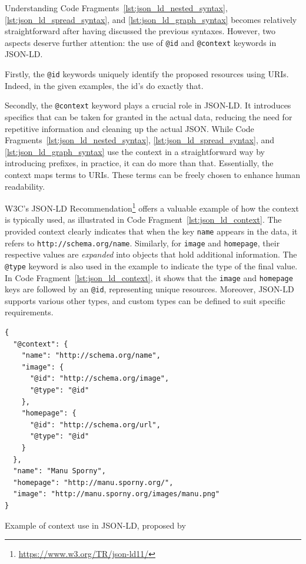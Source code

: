 \begin{itemize}
    Understanding Code Fragments~\ref{lst:json_ld_nested_syntax}, \ref{lst:json_ld_spread_syntax}, and \ref{lst:json_ld_graph_syntax} becomes relatively straightforward after having discussed the previous syntaxes. However, two aspects deserve further attention: the use of \texttt{@id} and \texttt{@context} keywords in JSON-LD.

    Firstly, the \texttt{@id} keywords uniquely identify the proposed resources using URIs. Indeed, in the given examples, the id's do exactly that. \citep{kellogg2020jsonld}

    Secondly, the \texttt{@context} keyword plays a crucial role in JSON-LD. It introduces specifics that can be taken for granted in the actual data, reducing the need for repetitive information and cleaning up the actual JSON. While Code Fragments~\ref{lst:json_ld_nested_syntax}, \ref{lst:json_ld_spread_syntax}, and \ref{lst:json_ld_graph_syntax} use the context in a straightforward way by introducing prefixes, in practice, it can do more than that. Essentially, the context maps terms to URIs. These terms can be freely chosen to enhance human readability. \citep{kellogg2020jsonld}

    W3C's JSON-LD Recommendation\footnote{\href{https://www.w3.org/TR/json-ld11/}{https://www.w3.org/TR/json-ld11/}} offers a valuable example of how the context is typically used, as illustrated in Code Fragment~\ref{lst:json_ld_context}. The provided context clearly indicates that when the key \texttt{name} appears in the data, it refers to \texttt{http://schema.org/name}. Similarly, for \texttt{image} and \texttt{homepage}, their respective values are \textit{expanded} into objects that hold additional information. The \texttt{@type} keyword is also used in the example to indicate the type of the final value. In Code Fragment~\ref{lst:json_ld_context}, it shows that the \texttt{image} and \texttt{homepage} keys are followed by an \texttt{@id}, representing unique resources. Moreover, JSON-LD supports various other types, and custom types can be defined to suit specific requirements. \citep{kellogg2020jsonld}

    \begin{listing}[htbp]
        \begin{verbatim}
{
  "@context": {
    "name": "http://schema.org/name",
    "image": {
      "@id": "http://schema.org/image",
      "@type": "@id"
    },
    "homepage": {
      "@id": "http://schema.org/url",
      "@type": "@id"
    }
  },
  "name": "Manu Sporny",
  "homepage": "http://manu.sporny.org/",
  "image": "http://manu.sporny.org/images/manu.png"
}
        \end{verbatim}
        \caption{Example of context use in JSON-LD, proposed by \cite{kellogg2020jsonld}}
        \label{lst:json_ld_context}
    \end{listing}


\end{itemize}
